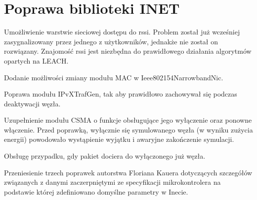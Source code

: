 \section{Poprawa biblioteki INET}
Umożliwienie warstwie sieciowej dostępu do rssi. Problem został już wcześniej zasygnalizowany przez jednego z użytkowników, jednakże nie został on rozwiązany. Znajomość rssi jest niezbędna do prawidłowego działania algorytmów opartych na LEACH.

Dodanie możliwości zmiany modułu MAC w Ieee802154NarrowbandNic.

Poprawa modułu IPvXTrafGen, tak aby prawidłowo zachowywał się podczas deaktywacji węzła.

Uzupełnienie modułu CSMA o funkcje obsługujące jego wyłączenie oraz ponowne włączenie. Przed poprawką, wyłącznie się symulowanego węzła (w wyniku zużycia energii) powodowało wystąpienie wyjątku i awaryjne zakończenie symulacji.

Obsługę przypadku, gdy pakiet dociera do wyłączonego już węzła.

Przeniesienie trzech poprawek autorstwa Floriana Kauera dotyczących szczegółów związanych z danymi zaczerpniętymi ze specyfikacji mikrokontrolera na podstawie której zdefiniowano domyślne parametry w Inecie.